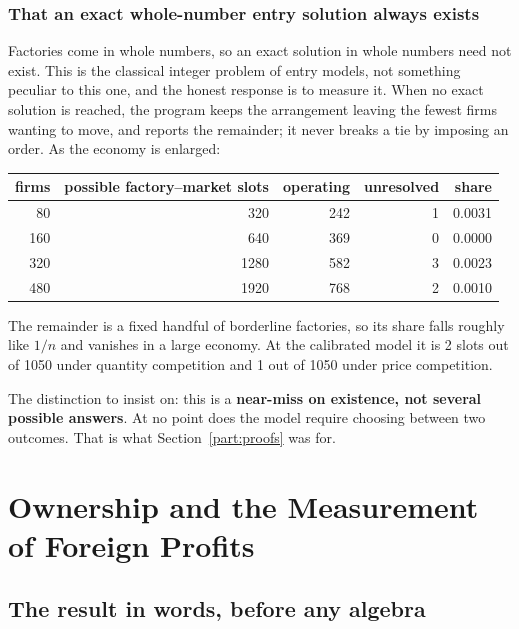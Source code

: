 \documentclass[11pt]{article}
\newenvironment{keypoint}
  {\begin{lrbox}{\kbox}\begin{minipage}{0.93\textwidth}\vspace{3pt}}
  {\vspace{3pt}\end{minipage}\end{lrbox}\begin{center}\fbox{\usebox{\kbox}}\end{center}}
\theoremstyle{plain}
\theoremstyle{remark}
\theoremstyle{definition}
\begin{document}
\subsubsection{That an exact whole-number entry solution always exists}

Factories come in whole numbers, so an exact solution in whole numbers need not exist.
This is the classical integer problem of entry models, not something peculiar to this
one, and the honest response is to measure it. When no exact solution is reached, the
program keeps the arrangement leaving the fewest firms wanting to move, and reports the
remainder; it never breaks a tie by imposing an order. As the economy is enlarged:

\begin{center}
\begin{tabular}{rrrrr}
\toprule
firms & possible factory--market slots & operating & unresolved & share\\
\midrule
80  & 320  & 242 & 1 & 0.0031\\
160 & 640  & 369 & 0 & 0.0000\\
320 & 1280 & 582 & 3 & 0.0023\\
480 & 1920 & 768 & 2 & 0.0010\\
\bottomrule
\end{tabular}
\end{center}

\noindent The remainder is a fixed handful of borderline factories, so its share falls
roughly like $1/n$ and vanishes in a large economy. At the calibrated model it is 2
slots out of 1050 under quantity competition and 1 out of 1050 under price competition.

\begin{keypoint}
The distinction to insist on: this is a \textbf{near-miss on existence, not several
possible answers}. At no point does the model require choosing between two outcomes.
That is what Section~\ref{part:proofs} was for.
\end{keypoint}

\newpage
\section{Ownership and the Measurement of Foreign Profits}
\label{sec:result}
\label{sec:main}

\subsection{The result in words, before any algebra}
\end{document}
